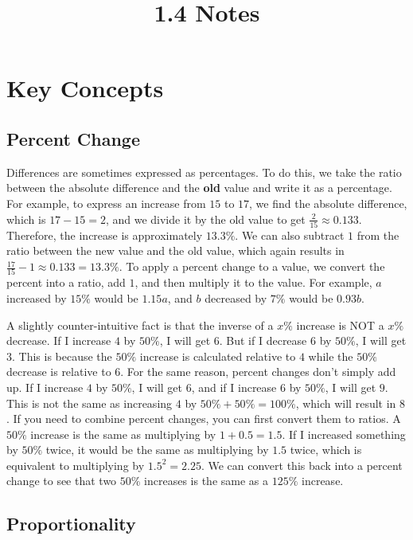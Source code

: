 \documentclass{article}
\title{1.4 Notes}
\author{}
\date{}
\begin{document}
    \maketitle
    \section*{Key Concepts}
    \subsection*{Percent Change}
    Differences are sometimes expressed as percentages. To do this, we take the
    ratio between the absolute difference and the \textbf{old} value and write
    it as a percentage. For example, to express an increase from $15$ to $17$,
    we find the absolute difference, which is $17 - 15 = 2$, and we divide it by
    the old value to get $\frac{2}{15} \approx 0.133$. Therefore, the increase
    is approximately $13.3\%$. We can also subtract $1$ from the ratio between
    the new value and the old value, which again results in $\frac{17}{15} - 1
    \approx 0.133 = 13.3\%$. To apply a percent change to a value, we convert
    the percent into a ratio, add $1$, and then multiply it to the value. For
    example, $a$ increased by $15\%$ would be $1.15a$, and $b$ decreased by
    $7\%$ would be $0.93b$.

    A slightly counter-intuitive fact is that the inverse of a $x\%$ increase is
    NOT a $x\%$ decrease. If I increase $4$ by $50\%$, I will get $6$. But if I
    decrease $6$ by $50\%$, I will get $3$. This is because the $50\%$ increase
    is calculated relative to $4$ while the $50\%$ decrease is relative to $6$.
    For the same reason, percent changes don't simply add up. If I increase $4$
    by $50\%$, I will get $6$, and if I increase $6$ by $50\%$, I will get $9$.
    This is not the same as increasing $4$ by $50\% + 50\% = 100\%$, which will
    result in $8$. If you need to combine percent changes, you can first convert
    them to ratios. A $50\%$ increase is the same as multiplying by $1 + 0.5 =
    1.5$. If I increased something by $50\%$ twice, it would be the same as
    multiplying by $1.5$ twice, which is equivalent to multiplying by $1.5^2 =
    2.25$. We can convert this back into a percent change to see that two $50\%$
    increases is the same as a $125\%$ increase.
    \subsection*{Proportionality}
\end{document}
